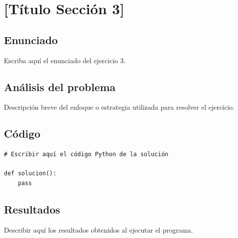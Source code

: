 
\section{[Título Sección 3]}

\subsection*{Enunciado}

\begin{tcolorbox}[colback=gray!8, colframe=gray!50, title=Ejercicio 3]
    Escriba aquí el enunciado del ejercicio 3.
\end{tcolorbox}

\subsection{Análisis del problema}

Descripción breve del enfoque o estrategia utilizada para resolver el ejercicio.

\subsection{Código}

\begin{lstlisting}[caption={Solución ejercicio 3}, label={lst:ej3}]
# Escribir aquí el código Python de la solución

def solucion():
    pass
\end{lstlisting}

\subsection{Resultados}

\begin{respuesta}
    Describir aquí los resultados obtenidos al ejecutar el programa.
\end{respuesta}


\newpage
